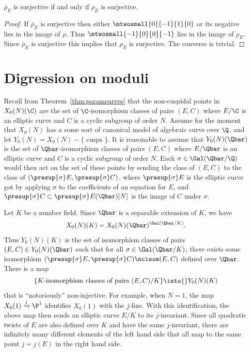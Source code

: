 \documentclass{report}
\begin{document}
\begin{proposition}\label{PropModSurj}
$\overline{\rho}_{E}$ is surjective if and only if $\rho_{E}$ is surjective.
\end{proposition}
\begin{proof}
If $\overline{\rho}_{E}$ is surjective then either
$\mtwosmall{0}{-1}{1}{\hfill 0}$
or its negative lies in the image of $\rho$. Thus
$\mtwosmall{-1}{\hfill 0}{\hfill 0}{-1}$
lies in the image of $\rho_{E}$. Since $\overline{\rho}_{E}$ is surjective
this implies that $\rho_{E}$ is surjective. The converse is trivial.
\end{proof}

\section{Digression on moduli}
Recall from Theorem~\ref{thm:paramcurves} that the non-cuspidal points
in $X_0(N)(\C)$ are the set of $\C$-isomorphism classes of pairs
$(E,C)$ where $E/\C$ is an elliptic curve and $C$ is a cyclic subgroup
of order $N$.  Assume for the moment that $X_0(N)$ has a
some sort of canonical model of algebraic curve over $\Q$, and let
$Y_0(N) = X_0(N) - \{\text{ cusps }\}$.
It is reasonable to assume that
$Y_0(N)(\Qbar)$ is the set of
$\Qbar$-isomorphism classes of pairs $(E,C)$ where $E/\Qbar$ is an
elliptic curve and $C$ is a cyclic subgroup of order $N$.  Each
$\sigma \in \Gal(\Qbar/\Q)$ would then act on the set of these
points by sending the
class of $(E,C)$ to the class of $(\presup{\sigma}E,
\presup{\sigma}C)$, where $\presup{\sigma}E$ is the elliptic curve got
by applying $\sigma$ to the coefficients of an equation for $E$, and
$\presup{\sigma}C \subset \presup{\sigma}E(\Qbar)[N]$ is the image of
$C$ under $\sigma$.

Let $K$ be a number field.  Since $\Qbar$ is a separable extension of $K$,
we have
$$X_0(N)(K) = X_0(N)(\Qbar)^{\Gal(\Qbar/K)}.$$
Thus $Y_0(N)(K)$ is the set of
isomorphism classes of pairs $(E,C) \in Y_0(N)(\Qbar)$ such that for
all $\sigma\in\Gal(\Qbar/K)$, there exists some isomorphism
$(\presup{\sigma}E, \presup{\sigma}C)\ncisom (E,C)$ defined over $\Qbar$.  There is a
map
$$\{\text{$K$-isomorphism classes of pairs $(E,C)/K$}\}\into{}Y_0(N)(K)$$
that is ``notoriously'' non-injective.  For example, when $N=1$, the
map $X_0(1) \xrightarrow{j} \P^1$ identifies $X_0(1)$ with the
$j$-line.  With this identification, the above map then sends an
elliptic curve $E/K$ to its $j$-invariant.  Since all quadratic twists
of $E$ are also defined over $K$ and have the same $j$-invariant, there
are infinitely many different elements of the left hand side that
all map to the same point $j=j(E)$ in the right hand side.
\end{document}
